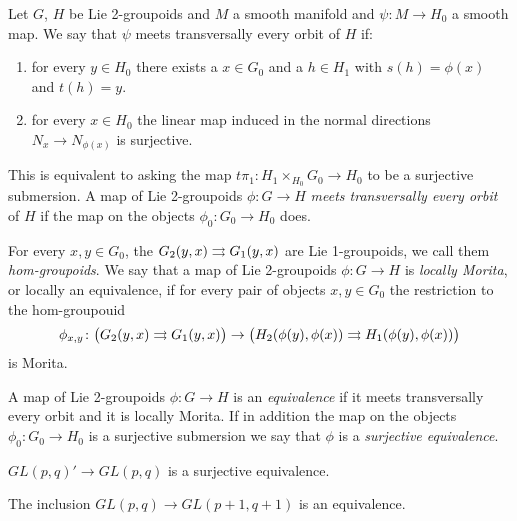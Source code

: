 Let $G$, $H$ be Lie 2-groupoids and $M$ a smooth manifold and $\psi\colon M\to H_0$ a smooth map.
We say that $\psi$ meets transversally every orbit of $H$ if:
\begin{enumerate}
  \item for every $y\in H_0$ there exists a $x\in G_0$ and a $h\in H_1$ with $s(h) = \phi(x)$ and $t(h) = y$.
  \item for every $x\in H_0$ the linear map induced in the normal directions $N_x\to N_{\phi(x)}$ is surjective.
\end{enumerate}
This is equivalent to asking the map $t\pi_1\colon H_1\times_{H_0} G_0 \to H_0$ to be a surjective submersion.
A map of Lie 2-groupoids $\phi\colon G\to H$ \emph{meets transversally every orbit} of $H$ if the map on the objects $\phi_0\colon G_0\to H_0$ does.

For every $x, y\in G_0$, the $G_2(y,x)\rightrightarrows G_1(y,x)$ are Lie 1-groupoids, we call them \emph{hom-groupoids}.
We say that a map of Lie 2-groupoids $\phi\colon G\to H$ is \emph{locally Morita}, or locally an equivalence, if for every pair of objects $x, y\in G_0$ the restriction to the hom-groupouid
\[ \phi_{x,y}\colon \big( G_2(y,x)\rightrightarrows G_1(y,x) \big) \to \big( H_2(\phi(y),\phi(x))\rightrightarrows H_1(\phi(y),\phi(x)) \big) \]
is Morita.

\begin{mydef}
A map of Lie 2-groupoids $\phi\colon G\to H$ is an \emph{equivalence} if it meets transversally every orbit and it is locally Morita.
If in addition the map on the objects $\phi_0\colon G_0\to H_0$ is a surjective submersion we say that $\phi$ is a \emph{surjective equivalence}.
\end{mydef}

\begin{example}
$GL(p,q)' \to GL(p,q)$ is a surjective equivalence.
\end{example}

\begin{example}
The inclusion $GL(p,q) \to GL(p+1,q+1)$ is an equivalence.
\end{example}

